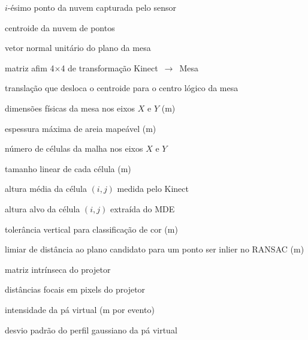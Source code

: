 \begin{simbolos}
\item[$\mathbf{p}_i$] $i$-ésimo ponto da nuvem capturada pelo sensor
\item[$\bar{\mathbf{p}}$] centroide da nuvem de pontos
\item[$\mathbf{n}$] vetor normal unitário do plano da mesa
\item[$T$] matriz afim 4$\times$4 de transformação Kinect~$\to$~Mesa
\item[$T_{\text{shift}}$] translação que desloca o centroide para o centro lógico da mesa
\item[$L_x, L_y$] dimensões físicas da mesa nos eixos $X$ e $Y$ (m)
\item[$h_{\max}$] espessura máxima de areia mapeável (m)
\item[$N_x, N_y$] número de células da malha nos eixos $X$ e $Y$
\item[$\Delta x, \Delta y$] tamanho linear de cada célula (m)
\item[$\bar{Z}^{\text{real}}_{i,j}$] altura média da célula $(i,j)$ medida pelo Kinect
\item[$Z^{\text{MDE}}_{i,j}$] altura alvo da célula $(i,j)$ extraída do MDE
\item[$\tau$] tolerância vertical para classificação de cor (m)
\item[$d_{\text{in}}$] limiar de distância ao plano candidato para um ponto ser inlier no RANSAC (m)
\item[$K$] matriz intrínseca do projetor
\item[$f_x, f_y$] distâncias focais em pixels do projetor
\item[$\alpha$] intensidade da pá virtual (m por evento)
\item[$\sigma$] desvio padrão do perfil gaussiano da pá virtual
\end{simbolos}
